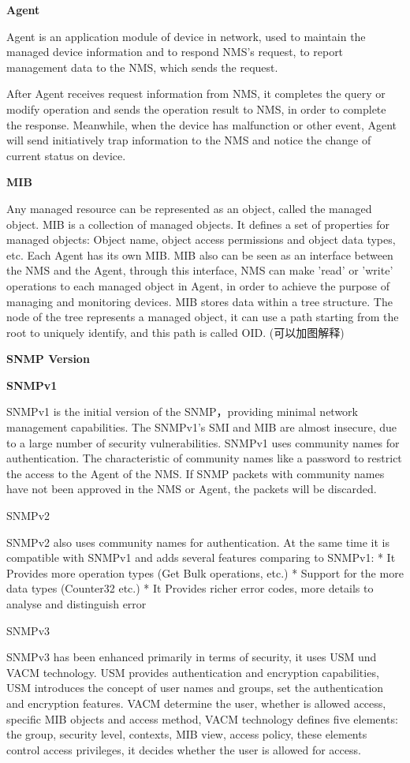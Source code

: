 \textbf{Agent}

Agent is an application module of device in network, used to maintain the managed device information and to respond NMS's request, to report management data to the NMS, which sends the request.  

After Agent receives request information from NMS, it completes the query or modify operation and sends the operation result to NMS, in order to complete the response. Meanwhile, when the device has malfunction or other event, Agent will send initiatively trap information to the NMS and notice the change of current status on device.  

\textbf{MIB}

Any managed resource can be represented as an object, called the managed object. MIB is a collection of managed objects. It defines a set of properties for managed objects: Object name, object access permissions and object data types, etc.  
Each Agent has its own MIB. MIB also can be seen as an interface between the NMS and the Agent, through this interface, NMS can make 'read' or 'write' operations to each managed object in Agent, in order to achieve the purpose of managing and monitoring devices.  
MIB stores data within a tree structure. The node of the tree represents a managed object, it can use a path starting from the root to uniquely identify, and this path is called OID. (可以加图解释)  

\textbf{SNMP Version}

\textbf{SNMPv1}

SNMPv1 is the initial version of the SNMP，providing minimal network management capabilities. The SNMPv1's SMI and MIB are almost insecure, due to a large number of security vulnerabilities.  
SNMPv1 uses community names for authentication. The characteristic of community names like a password to restrict the access to the Agent of the NMS. If SNMP packets with community names have not been approved in the NMS or Agent, the packets will be discarded.  

SNMPv2

SNMPv2 also uses community names for authentication. At the same time it is compatible with SNMPv1 and adds several features comparing to SNMPv1:  
* It Provides more operation types (Get Bulk operations, etc.)
* Support for the more data types (Counter32 etc.)
* It Provides richer error codes, more details to analyse and distinguish error  

SNMPv3

SNMPv3 has been enhanced primarily in terms of security, it uses USM und VACM technology.  
USM provides authentication and encryption capabilities, USM introduces the concept of user names and groups, set the authentication and encryption features.  
VACM determine the user, whether is allowed access, specific MIB objects and access method, VACM technology defines five elements: the group, security level, contexts, MIB view, access policy, these elements control access privileges, it decides whether the user is allowed for access.

